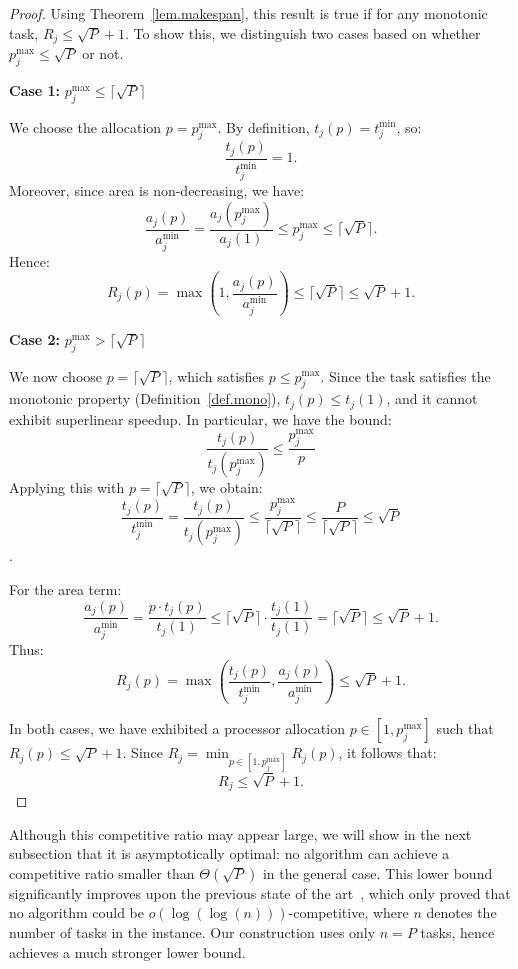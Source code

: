 \documentclass{article}
\newcommand\ratio{R\xspace}
\begin{document}
\begin{proof}
Using Theorem~\ref{lem.makespan}, this result is true if for any monotonic task, $R_j \leq \sqrt{P}+1$. To show this, we distinguish two cases based on whether \( p_j^{\max} \le \sqrt{P} \) or not.

\textbf{Case 1:} \( p_j^{\max} \le \lceil \sqrt{P} \rceil \)

We choose the allocation \( p = p_j^{\max} \). By definition, \( t_j(p) = t_j^{\min} \), so:
\[
\frac{t_j(p)}{t_j^{\min}} = 1.
\]
Moreover, since area is non-decreasing, we have:
\[
\frac{a_j(p)}{a_j^{\min}} = \frac{a_j(p_j^{\max})}{a_j(1)} \le p_j^{\max} \le \lceil \sqrt{P} \rceil.
\]
Hence:
\[
\ratio_j(p) = \max\left(1, \frac{a_j(p)}{a_j^{\min}}\right) \le \lceil \sqrt{P} \rceil \le \sqrt{P} + 1.
\]

\textbf{Case 2:} \( p_j^{\max} > \lceil \sqrt{P} \rceil \)

We now choose \( p = \lceil \sqrt{P} \rceil \), which satisfies \( p \le p_j^{\max} \). Since the task satisfies the monotonic property (Definition~\ref{def.mono}), $t_j(p) \leq t_j(1)$, and it cannot exhibit superlinear speedup. In particular, we have the bound:
\[
\frac{t_j(p)}{t_j(p_j^{\max})} \le \frac{p_j^{\max}}{p}
\]
Applying this with \( p = \lceil \sqrt{P} \rceil \), we obtain:
\[
\frac{t_j(p)}{t_j^{\min}} = \frac{t_j(p)}{t_j(p_j^{\max})} \le \frac{p_j^{\max}}{\lceil \sqrt{P} \rceil} \le \frac{P}{\lceil \sqrt{P} \rceil} \le \sqrt{P}
\].

For the area term:
\[
\frac{a_j(p)}{a_j^{\min}} = \frac{p \cdot t_j(p)}{t_j(1)} \le \lceil \sqrt{P} \rceil \cdot \frac{t_j(1)}{t_j(1)} = \lceil \sqrt{P} \rceil \le \sqrt{P} + 1.
\]
Thus:
\[
\ratio_j(p) = \max\left( \frac{t_j(p)}{t_j^{\min}}, \frac{a_j(p)}{a_j^{\min}} \right) \le \sqrt{P} + 1.
\]

In both cases, we have exhibited a processor allocation \( p \in [1, p_j^{\max}] \) such that \( \ratio_j(p) \le \sqrt{P} + 1 \). Since \(\ratio_j = \min_{p \in [1, p_j^{\max}]} \ratio_j(p)\), it follows that:
\[
\ratio_j \le \sqrt{P} + 1.
\]


\end{proof}

Although this competitive ratio may appear large, we will show in the next subsection that it is asymptotically optimal: no algorithm can achieve a competitive ratio smaller than $\Theta(\sqrt{P})$ in the general case. This lower bound significantly improves upon the previous state of the art~\cite{TOPC24}, which only proved that no algorithm could be $o(\log(\log(n)))$-competitive, where $n$ denotes the number of tasks in the instance. Our construction uses only $n = P$ tasks, hence achieves a much stronger lower bound.
\end{document}
